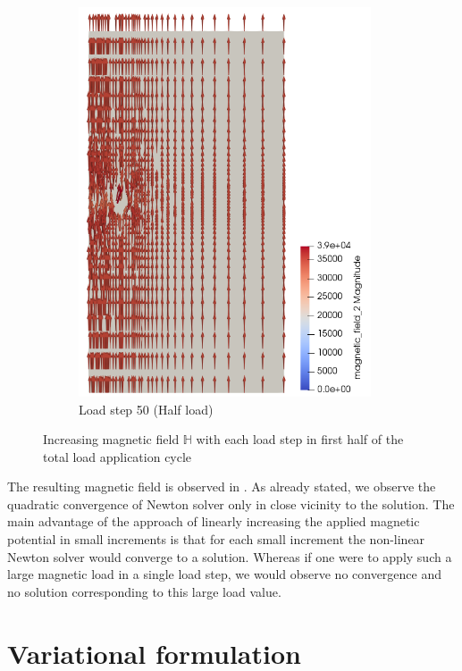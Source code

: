 \documentclass[11pt,a4paper,final]{article}
\begin{document}
\begin{figure}[h]
\begin{subfigure}{0.32\textwidth}
\includegraphics[width=0.95\textwidth]{magnetic_field_50.png}
\caption{Load step 50 (Half load)}
\label{fig:3.7.3}
\end{subfigure}
\caption{Increasing magnetic field $\mathbb{H}$ with each load step in first half of the total load application cycle}
\label{fig:3.7}
\end{figure}

The resulting magnetic field is observed in . As already stated, we observe the quadratic convergence of Newton solver only in close vicinity to the solution. The main advantage of the approach of linearly increasing the applied magnetic potential in small increments is that for each small increment the non-linear Newton solver would converge to a solution. Whereas if one were to apply such a large magnetic load in a single load step, we would observe no convergence and no solution corresponding to this large load value. \par 

\section{Variational formulation}
\end{document}
